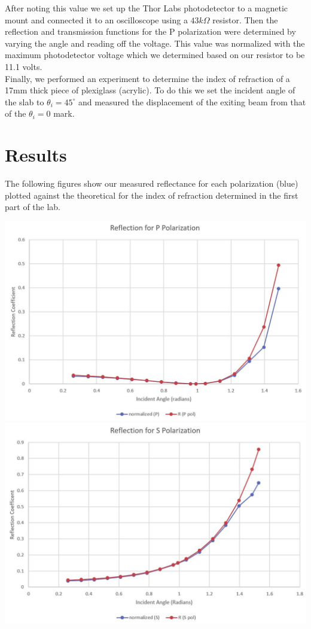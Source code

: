 \documentclass[letter, 11pt, onecolumn]{article}
\begin{document}
\noindent After noting this value we set up the Thor Labs photodetector to a magnetic mount and connected it to an oscilloscope using a $43 k\Omega$ resistor. Then the reflection and transmission functions for the P polarization were determined by varying the angle and reading off the voltage. This value was normalized with the maximum photodetector voltage which we determined based on our resistor to be 11.1 volts. \\ 

\noindent Finally, we performed an experiment to determine the index of refraction of a 17mm thick piece of plexiglass (acrylic). To do this we set the incident angle of the slab to $\theta_i = 45^{\circ}$ and measured the displacement of the exiting beam from that of the $\theta_i = 0$ mark. 

\section*{Results} 
The following figures show our measured reflectance for each polarization (blue) plotted against the theoretical for the index of refraction determined in the first part of the lab. 
	\begin{center}
		\includegraphics[width=0.75\columnwidth]{ref_p}\\
		\includegraphics[width=0.75\columnwidth]{ref_s}
	\end{center} 
	
\end{document}
